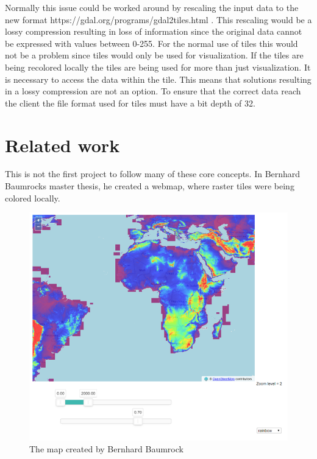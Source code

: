 Normally this issue could be worked around by rescaling the input data to the new format https://gdal.org/programs/gdal2tiles.html . This rescaling would be a lossy compression resulting in loss of information since the original data cannot be expressed with values between 0-255. \citep{dent}
For the normal use of tiles this would not be a problem since tiles would only be used for visualization. 
If the tiles are being recolored locally the tiles are being used for more than just visualization. It is necessary to access the data within the tile. This means that solutions resulting in a lossy compression are not an option. To ensure that the correct data reach the client the file format used for tiles must have a bit depth of 32. 
  






\section{Related work}
This is not the first project to follow many of these core concepts. In Bernhard Baumrocks master thesis, he created a webmap, where raster tiles were being colored locally. \citep{Buamrocks}
\begin{figure} [H]
	\centering
	\includegraphics[width=.8\textwidth]{Pictures/BaumrockMap1}
	\caption{The map created by Bernhard Baumrock}
	\label{BaumrockMap1}
\end{figure}

